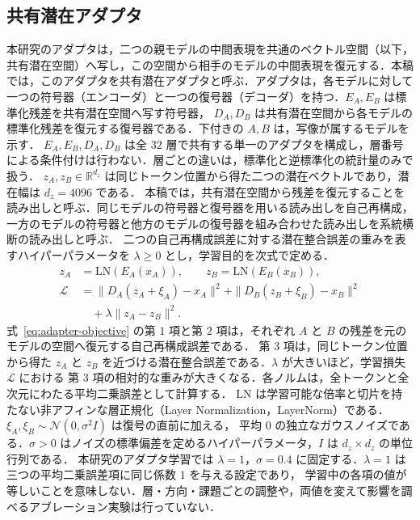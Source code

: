 \documentclass[techrep,noauthor]{ipsj}
\newcommand{\rev}[1]{{\color{blue}#1}}
\newcommand{\revr}[1]{{\color{red}#1}}
\begin{document}
\subsection{共有潜在アダプタ}\label{sec:adapter}
\rev{本研究のアダプタは，二つの親モデルの中間表現を共通のベクトル空間（以下，共有潜在空間）へ写し，この空間から相手のモデルの中間表現を復元する．本稿では，このアダプタを共有潜在アダプタと呼ぶ．}アダプタは，各モデルに対して一つの符号器\rev{（エンコーダ）}と一つの復号器\rev{（デコーダ）}を持つ．$E_A,E_B$ は標準化残差を共有潜在空間へ写す符号器，
$D_A,D_B$ は共有潜在空間から各モデルの標準化残差を復元する復号器である．下付きの $A,B$ は，写像が属するモデルを示す．
\revr{$E_A,E_B,D_A,D_B$ は全 $32$ 層で共有する単一のアダプタを構成し，層番号による条件付けは行わない．層ごとの違いは，標準化と逆標準化の統計量のみで扱う．}
$z_A,z_B\in\mathbb R^{d_z}$ は同じトークン位置から得た二つの潜在ベクトルであり，潜在幅は $d_z{=}4096$ である．
\revr{本稿では，共有潜在空間から残差を復元することを読み出しと呼ぶ．同じモデルの符号器と復号器を用いる読み出しを自己再構成，
一方のモデルの符号器と他方のモデルの復号器を組み合わせた読み出しを系統横断の読み出しと呼ぶ．}
二つの自己再構成誤差に対する潜在整合誤差の重みを表すハイパーパラメータを $\lambda\geq0$ とし，学習目的を次式で定める．
\begin{equation}\label{eq:adapter-objective}
\begin{aligned}
z_A &= \mathrm{LN}(E_A(x_A)),\qquad z_B = \mathrm{LN}(E_B(x_B)),\\
\mathcal{L} &=
\|D_A(z_A{+}\xi_A){-}x_A\|^2+\|D_B(z_B{+}\xi_B){-}x_B\|^2\\
&\quad+\lambda\|z_A{-}z_B\|^2 .
\end{aligned}
\end{equation}
式~\eqref{eq:adapter-objective} の第 $1$ 項と第 $2$ 項は，それぞれ $A$ と $B$ の残差を元のモデルの空間へ復元する自己再構成誤差である．
第 $3$ 項は，同じトークン位置から得た $z_A$ と $z_B$ を近づける潜在整合誤差である．$\lambda$ が大きいほど，学習損失 $\mathcal L$ における
第 $3$ 項の相対的な重みが大きくなる．各ノルムは，全トークンと全次元にわたる平均二乗誤差として計算する．
$\mathrm{LN}$ は学習可能な倍率と切片を持たない\rev{非アフィンな}層正規化（\rev{Layer Normalization，}LayerNorm）である．$\xi_A,\xi_B\sim\mathcal N(0,\sigma^2 I)$ は復号の直前に加える，
平均 $0$ の独立なガウスノイズである．$\sigma>0$ はノイズの標準偏差を定めるハイパーパラメータ，$I$ は $d_z{\times}d_z$ の単位行列である．
本研究のアダプタ学習では $\lambda{=}1$，$\sigma{=}0.4$ に固定する．$\lambda{=}1$ は三つの平均二乗誤差項に同じ係数 $1$ を与える設定であり，
学習中の各項の値が等しいことを意味しない．層・方向・課題ごとの調整や，\rev{両値を変えて影響を調べるアブレーション実験}は行っていない．
\end{document}
